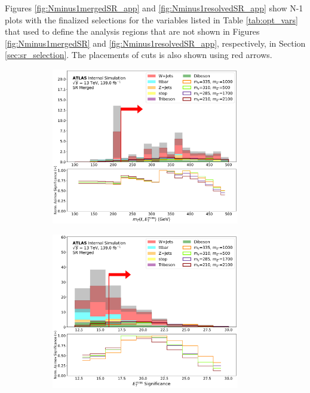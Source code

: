 \label{chapter:appendix_SR_N_1}

Figures \ref{fig:Nminus1mergedSR_app} and \ref{fig:Nminus1resolvedSR_app} show N-1 plots with the finalized selections for the variables listed in Table \ref{tab:opt_vars} that used to define the analysis regions that are not shown in Figures \ref{fig:Nminus1mergedSR} and \ref{fig:Nminus1resolvedSR_app}, respectively, in Section \ref{sec:sr_selection}. The placements of cuts is also shown using red arrows.

\begin{figure}[htbp]
  \centering
    \begin{subfigure}[t]{0.48\textwidth}
    \centering
     \includegraphics[width = 0.9\textwidth]{Figures/5/SR1L_Merged/mT_lep_met_normSig_N_1.pdf}
    \caption{\mtlepmet}
    \end{subfigure}
    \begin{subfigure}[t]{0.48\textwidth}
    \centering
     \includegraphics[width = 0.9\textwidth]{Figures/5/SR1L_Merged/MetTST_Significance_normSig_N_1.pdf}

\end{subfigure}
\end{figure}
